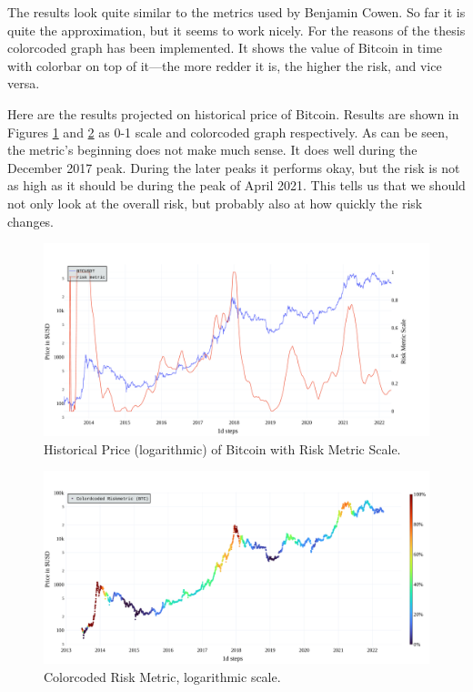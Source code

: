 The results look quite similar to the metrics used by Benjamin Cowen. So far it is quite the approximation, but it seems to work nicely. For the reasons of the thesis colorcoded graph has been implemented. It shows the value of Bitcoin in time with colorbar on top of it---the more redder it is, the higher the risk, and vice versa.

Here are the results projected on historical price of Bitcoin. Results are shown in Figures \ref{figure-50week-scale} and \ref{figure-50week-colorcoded} as 0-1 scale and colorcoded graph respectively. As can be seen, the metric's beginning does not make much sense. It does well during the December 2017 peak. During the later peaks it performs okay, but the risk is not as high as it should be during the peak of April 2021. This tells us that we should not only look at the overall risk, but probably also at how quickly the risk changes.

\begin{figure}[!hbt]
    \centering
    \includegraphics[width=\columnwidth]{figures/50week-scale.pdf}
    \caption{Historical Price (logarithmic) of Bitcoin with Risk Metric Scale.}
    \label{figure-50week-scale}
\end{figure}

\begin{figure}[!hbt]
    \centering
    \includegraphics[width=\columnwidth]{figures/50week-colorcoded.pdf}
    \caption{Colorcoded Risk Metric, logarithmic scale.}
    \label{figure-50week-colorcoded}
\end{figure}

